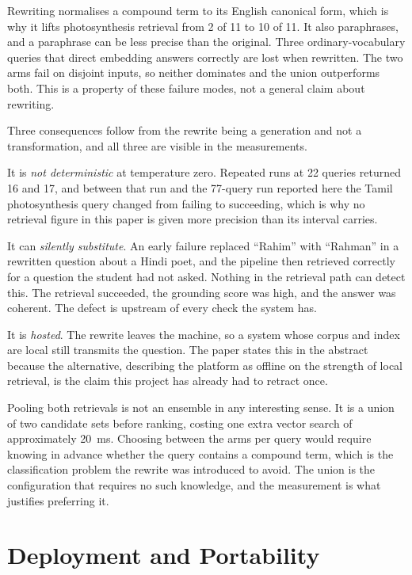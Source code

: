 Rewriting normalises a compound term to its English canonical form, which is why it lifts photosynthesis retrieval from 2 of 11 to 10 of 11. It also paraphrases, and a paraphrase can be less precise than the original. Three ordinary-vocabulary queries that direct embedding answers correctly are lost when rewritten. The two arms fail on disjoint inputs, so neither dominates and the union outperforms both. This is a property of these failure modes, not a general claim about rewriting.

Three consequences follow from the rewrite being a generation and not a transformation, and all three are visible in the measurements.

It is \emph{not deterministic} at temperature zero. Repeated runs at 22 queries returned 16 and 17, and between that run and the 77-query run reported here the Tamil photosynthesis query changed from failing to succeeding, which is why no retrieval figure in this paper is given more precision than its interval carries.

It can \emph{silently substitute}. An early failure replaced ``Rahim'' with ``Rahman'' in a rewritten question about a Hindi poet, and the pipeline then retrieved correctly for a question the student had not asked. Nothing in the retrieval path can detect this. The retrieval succeeded, the grounding score was high, and the answer was coherent. The defect is upstream of every check the system has.

It is \emph{hosted}. The rewrite leaves the machine, so a system whose corpus and index are local still transmits the question. The paper states this in the abstract because the alternative, describing the platform as offline on the strength of local retrieval, is the claim this project has already had to retract once.

Pooling both retrievals is not an ensemble in any interesting sense. It is a union of two candidate sets before ranking, costing one extra vector search of approximately 20~ms. Choosing between the arms per query would require knowing in advance whether the query contains a compound term, which is the classification problem the rewrite was introduced to avoid. The union is the configuration that requires no such knowledge, and the measurement is what justifies preferring it.

\section{Deployment and Portability}
\label{sec:deployment}

